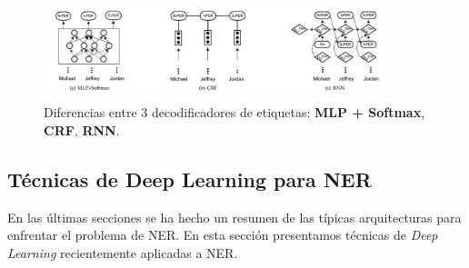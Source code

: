 \begin{figure}[h!]
	\centering
	\includegraphics[width = 10cm]{Graphics/TagDecoders.png}
	\caption{Diferencias entre 3 decodificadores de etiquetas: \textbf{MLP + Softmax}, \textbf{CRF}, \textbf{RNN}.}\label{fig:tagDec}
\end{figure}


\subsection{T\'ecnicas de Deep Learning para NER}
En las \'ultimas secciones se ha hecho un resumen de las t\'ipicas arquitecturas para enfrentar el problema de NER. En esta secci\'on presentamos t\'ecnicas de \emph{Deep Learning} recientemente aplicadas a NER.

